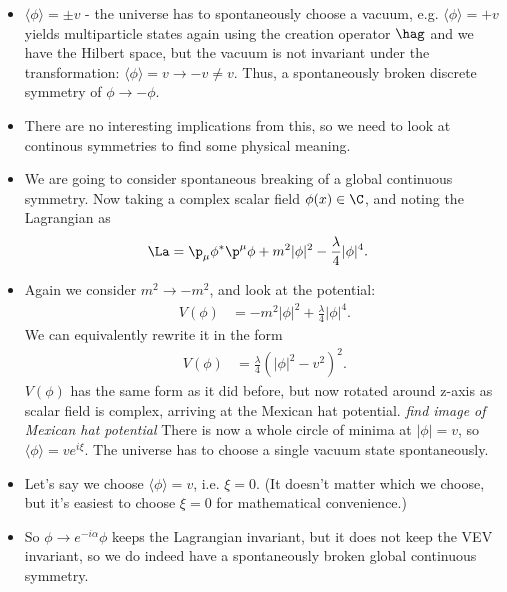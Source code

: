 \documentclass[relqm.tex]{subfiles}
\begin{document}
\begin{itemize}
\begin{figure}[H]
\begin{tikzpicture}
            \end{tikzpicture}
        \end{figure}
    \item $\langle\phi\rangle=\pm v$ - the universe has to spontaneously choose a vacuum, e.g. $\langle\phi\rangle=+v$ yields multiparticle states again using the creation operator $\hag$ and we have the Hilbert space, but the vacuum is not invariant under the transformation: $\langle\phi\rangle=v\to-v\neq v$.
        Thus, a spontaneously broken discrete symmetry of $\phi\to-\phi$.
    \item There are no interesting implications from this, so we need to look at continous symmetries to find some physical meaning.
    \item We are going to consider spontaneous breaking of a global continuous symmetry. 
        Now taking a complex scalar field $\phi(x)\in\C$, and noting the Lagrangian as
        \begin{align}
            \La &= \p_\mu\phi^*\p^\mu\phi + m^2|\phi|^2 - \frac{\lambda}{4}|\phi|^4.
        \end{align}
    \item Again we consider $m^2\to-m^2$, and look at the potential:
        \begin{align}
            V(\phi) &= -m^2|\phi|^2 + \frac{\lambda}{4}|\phi|^4.
        \end{align}
        We can equivalently rewrite it in the form
        \begin{align}
            V(\phi) &= \frac{\lambda}{4}\left(|\phi|^2-v^2\right)^2.
        \end{align}
        $V(\phi)$ has the same form as it did before, but now rotated around z-axis as scalar field is complex, arriving at the Mexican hat potential. 
        \emph{find image of Mexican hat potential}
        There is now a whole circle of minima at $|\phi|=v$, so $\langle\phi\rangle = ve^{i\xi}$. 
        The universe has to choose a single vacuum state spontaneously. 
    \item Let's say we choose $\langle\phi\rangle = v$, i.e. $\xi=0$. (It doesn't matter which we choose, but it's easiest to choose $\xi=0$ for mathematical convenience.)
    \item So $\phi\to e^{-i\alpha}\phi$ keeps the Lagrangian invariant, but it does not keep the VEV invariant, so we do indeed have a spontaneously broken global continuous symmetry. 
\end{itemize}

\chapter{}
\end{document}
